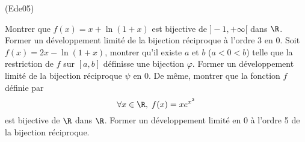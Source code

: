 \begin{tiny}(Ede05)\end{tiny}
Montrer que $f(x)=x+\ln (1+x)$ est bijective de $]-1,+\infty[$ dans $\R$. Former un d{\'e}veloppement limit{\'e} de la bijection r{\'e}ciproque {\`a} l'ordre 3 en 0.\newline
Soit $f(x)=2x-\ln (1+x)$, montrer qu'il existe $a$ et $b$ ($a<0<b$) telle que la restriction de $f$ sur $[a,b]$ définisse une bijection $\varphi$. Former un développement limité de la bijection réciproque $\psi$ en $0$.\newline
De même, montrer que la fonction $f$ définie par
\[
 \forall x \in \R, \; f(x) = xe^{x^2}
\]
est bijective de $\R$ dans $\R$. Former un développement limité en $0$ à l'ordre 5 de la bijection réciproque.

